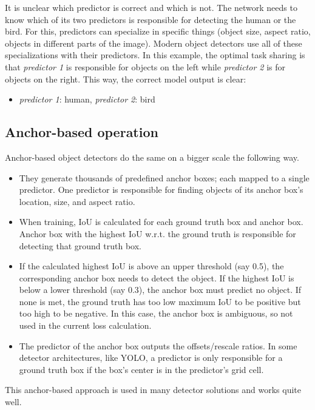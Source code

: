 It is unclear which predictor is correct and which is not. The network needs to know which of its two predictors is responsible for detecting the human or the bird. For this, predictors can specialize in specific things (object size, aspect ratio, objects in different parts of the image). Modern object detectors use all of these specializations with their predictors. In this example, the optimal task sharing is that \textit{predictor 1} is responsible for objects on the left while \textit{predictor 2} is for objects on the right. This way, the correct model output is clear:

\begin{itemize}
  \item \textit{predictor 1}: human, \textit{predictor 2}: bird
\end{itemize}

\subsection{Anchor-based operation}

Anchor-based object detectors do the same on a bigger scale the following way.

\begin{itemize}
  \item They generate thousands of predefined anchor boxes; each mapped to a single predictor. One predictor is responsible for finding objects of its anchor box's location, size, and aspect ratio.
  \item When training, IoU is calculated for each ground truth box and anchor box. Anchor box with the highest IoU w.r.t. the ground truth is responsible for detecting that ground truth box.
  \item If the calculated highest IoU is above an upper threshold (say 0.5), the corresponding anchor box needs to detect the object. If the highest IoU is below a lower threshold (say 0.3), the anchor box must predict no object. If none is met, the ground truth has too low maximum IoU to be positive but too high to be negative. In this case, the anchor box is ambiguous, so not used in the current loss calculation.
  \item The predictor of the anchor box outputs the offsets/rescale ratios. In some detector architectures, like YOLO, a predictor is only responsible for a ground truth box if the box's center is in the predictor's grid cell.
\end{itemize}

This anchor-based approach is used in many detector solutions and works quite well.

